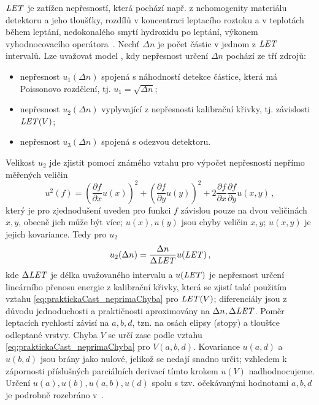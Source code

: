 $\mathit{LET}$ je zatížen nepřesností, která pochází např. z nehomogenity materiálu detektoru a jeho tloušťky, rozdílů v koncentraci leptacího roztoku a v teplotách během leptání, nedokonalého smytí hydroxidu po leptání, výkonem vyhodnocovacího operátora~\cite{nejistoty}. Nechť $\Delta n$ je počet částic v jednom z $\mathit{LET}$ intervalů. Lze uvažovat model \cite{nejistoty}, kdy nepřesnost určení $\Delta n$ pochází ze tří zdrojů:
\begin{itemize}
  \item nepřesnost $u_1(\Delta n)$ spojená s náhodností detekce částice, která má Poissonovo rozdělení, tj. $u_1=\sqrt{\Delta n}$;
  \item nepřesnost $u_2(\Delta n)$ vyplyvající z nepřesnosti kalibrační křivky, tj. závislosti $\mathit{LET}(V)$;
  \item nepřesnost $u_3(\Delta n)$ spojená s odezvou detektoru.
\end{itemize}
Velikost $u_2$ jde zjistit pomocí známého vztahu pro výpočet nepřesností nepřímo měřených veličin
\begin{equation}
  u^2(f)=\left(\frac{\partial f}{\partial x}u(x)\right)^2+\left( \frac{\partial f}{\partial y}u(y) \right)^2+2\frac{\partial f}{\partial x}\frac{\partial f}{\partial y}u(x,y)\,,
  \label{eq:praktickaCast_neprimaChyba}
\end{equation}
který je pro zjednodušení uveden pro funkci $f$ závislou pouze na dvou veličinách $x,y$, obecně jich může být více; $u(x), u(y)$ jsou chyby veličin $x,y$; $u(x,y)$ je jejich kovariance. Tedy pro $u_2$
\begin{equation}
  u_2(\Delta n)=\frac{\Delta n}{\Delta\mathit{LET}}u(\mathit{LET})\,,
  \label{eq:praktickaCast_u2}
\end{equation}
kde $\Delta\mathit{LET}$ je délka uvažovaného intervalu a $u(\mathit{LET})$ je nepřesnost určení lineárního přenosu energie z kalibrační křivky, která se zjistí také použitím vztahu \eqref{eq:praktickaCast_neprimaChyba} pro $\mathit{LET}(V)$; diferenciály jsou z důvodu jednoduchosti a praktičnosti aproximovány na $\Delta n, \Delta\mathit{LET}$. Poměr leptacích rychlostí závisí na $a,b,d$, tzn. na osách elipsy (stopy) a tloušťce odleptané vrstvy. Chyba $V$ se určí zase podle vztahu \eqref{eq:praktickaCast_neprimaChyba} pro $V(a,b,d)$. Kovariance $u(a,d)$ a $u(b,d)$ jsou brány jako nulové, jelikož se nedají snadno určit; vzhledem k zápornosti příslušných parciálních derivací tímto krokem $u(V)$ nadhodnocujeme. Určení $u(a), u(b), u(a,b), u(d)$ spolu s tzv. očekávanými hodnotami $a,b,d$ je podrobně
rozebráno v~\cite{nejistoty}.

